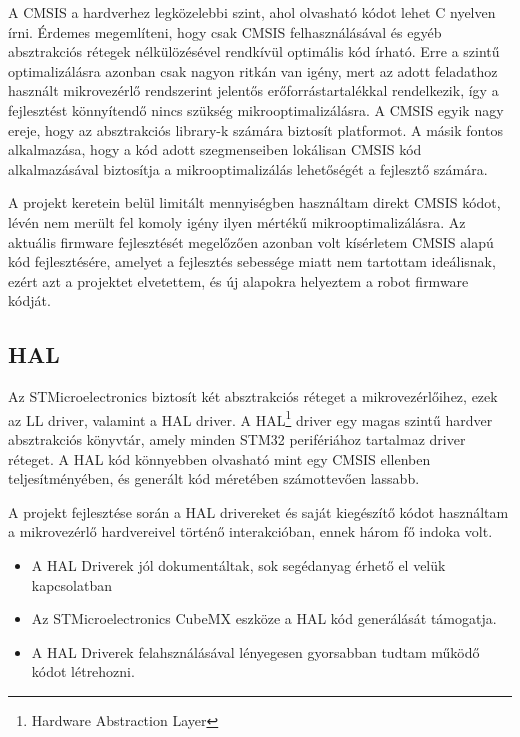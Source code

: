 
A CMSIS a hardverhez legközelebbi szint, ahol olvasható kódot lehet C nyelven
írni. Érdemes megemlíteni, hogy csak CMSIS felhasználásával és egyéb absztrakciós
rétegek nélkülözésével rendkívül optimális kód írható. Erre a szintű
optimalizálásra azonban csak nagyon ritkán van igény, mert az adott feladathoz
használt mikrovezérlő rendszerint jelentős erőforrástartalékkal rendelkezik, így
a fejlesztést könnyítendő nincs szükség mikrooptimalizálásra. A CMSIS egyik nagy ereje,
hogy az absztrakciós library-k számára biztosít platformot. A másik fontos
alkalmazása, hogy a kód adott szegmenseiben lokálisan CMSIS kód alkalmazásával
biztosítja a mikrooptimalizálás lehetőségét a fejlesztő számára.

\medskip

A projekt keretein belül limitált mennyiségben használtam direkt CMSIS kódot,
lévén nem merült fel komoly igény ilyen mértékű mikrooptimalizálásra. Az aktuális
firmware fejlesztését megelőzően azonban volt kísérletem CMSIS alapú kód
fejlesztésére, amelyet a fejlesztés sebessége miatt nem tartottam ideálisnak,
ezért azt a projektet elvetettem, és új alapokra helyeztem a robot firmware
kódját.

\subsection{HAL}

Az STMicroelectronics biztosít két absztrakciós réteget a mikrovezérlőihez, ezek
az LL driver, valamint a HAL driver. A HAL\footnote{Hardware Abstraction Layer}
driver egy magas szintű hardver absztrakciós könyvtár, amely minden STM32
perifériához tartalmaz driver réteget. A HAL kód könnyebben olvasható mint egy
CMSIS ellenben teljesítményében, és generált kód méretében számottevően lassabb.

A projekt fejlesztése során a HAL drivereket és saját kiegészítő kódot használtam
a mikrovezérlő hardvereivel történő interakcióban, ennek három fő indoka volt.

\begin{itemize}
\item{A HAL Driverek jól dokumentáltak, sok segédanyag érhető el velük
  kapcsolatban}
\item{Az STMicroelectronics CubeMX eszköze a HAL kód generálását támogatja.}
\item{A HAL Driverek felahsználásával lényegesen gyorsabban tudtam működő kódot
  létrehozni.}
\end{itemize}


